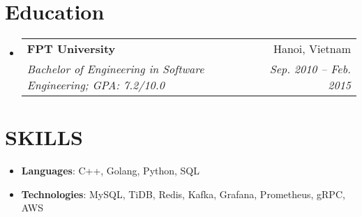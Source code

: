 \documentclass[letterpaper,11pt]{article}
\makeatletter
\newcommand{\resumeItem}[2]{
  \item\small{
    \textbf{#1}{: #2 \vspace{-2pt}}
  }
}
\newcommand{\resumeSubheading}[4]{
  \vspace{-1pt}\item
    \begin{tabular*}{0.97\textwidth}[t]{l@{\extracolsep{\fill}}r}
      \textbf{#1} & #2 \\
      \textit{\small#3} & \textit{\small #4} \\
    \end{tabular*}\vspace{-5pt}
}
\newcommand{\resumeSubItem}[2]{\resumeItem{#1}{#2}\vspace{-4pt}}
\newcommand{\resumeSubHeadingListStart}{\begin{itemize}[leftmargin=*]}
\newcommand{\resumeSubHeadingListEnd}{\end{itemize}}
\makeatother
\begin{document}


\section{Education}
  \resumeSubHeadingListStart
    \resumeSubheading
      {FPT University}{Hanoi, Vietnam}
      {Bachelor of Engineering in Software Engineering;  GPA: 7.2/10.0}{Sep. 2010 -- Feb. 2015}
  \resumeSubHeadingListEnd

\section{SKILLS}
  \resumeSubHeadingListStart
    \resumeSubItem{Languages}
      {C++, Golang, Python, SQL}
    \resumeSubItem{Technologies}
      { MySQL, TiDB, Redis, Kafka, Grafana, Prometheus, gRPC, AWS}
  \resumeSubHeadingListEnd

\end{document}
